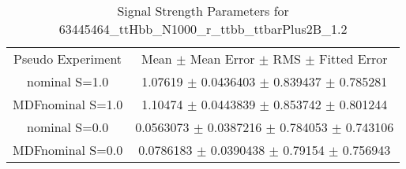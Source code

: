 \begin{table}
\centering
\caption{Signal Strength Parameters for 63445464\_ttHbb\_N1000\_r\_ttbb\_ttbarPlus2B\_1.2}
\begin{tabular}{cc}
\toprule
Pseudo Experiment & Mean $\pm$ Mean Error $\pm$ RMS $\pm$ Fitted Error\\
nominal S=1.0 & \num{1.07619} $\pm$ \num{0.0436403} $\pm$ \num{0.839437} $\pm$ \num{0.785281}\\
MDFnominal S=1.0 & \num{1.10474} $\pm$ \num{0.0443839} $\pm$ \num{0.853742} $\pm$ \num{0.801244}\\
nominal S=0.0 & \num{0.0563073} $\pm$ \num{0.0387216} $\pm$ \num{0.784053} $\pm$ \num{0.743106}\\
MDFnominal S=0.0 & \num{0.0786183} $\pm$ \num{0.0390438} $\pm$ \num{0.79154} $\pm$ \num{0.756943}\\
\bottomrule
\end{tabular}
\end{table}